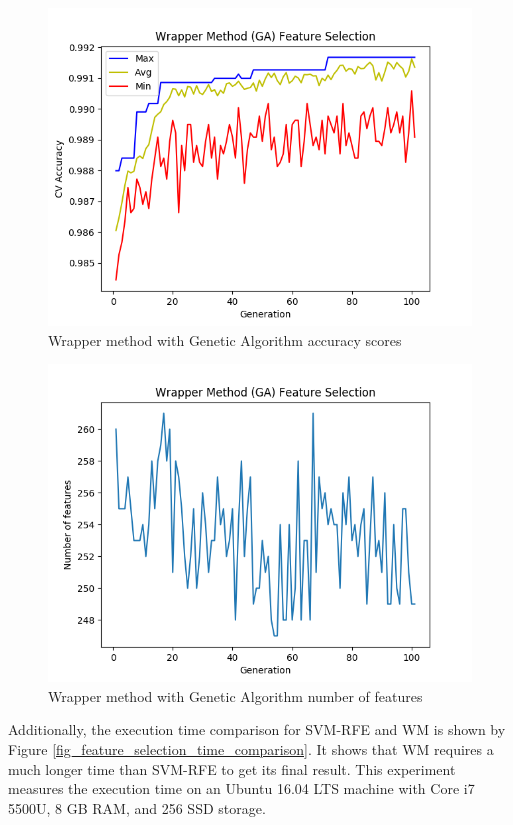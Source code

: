 \documentclass[conference]{IEEEtran}
\begin{document}
\begin{figure}
	\centering	
	\includegraphics[scale=0.45]{../images/WM_GA_SVM_acc_chart.png}
	\caption{Wrapper method with Genetic Algorithm accuracy scores}
	\label{fig_wm_acc_chart}
\end{figure}

\begin{figure}
	\centering	
	\includegraphics[scale=0.45]{../images/WM_GA_SVM_feat_chart.png}
	\caption{Wrapper method with Genetic Algorithm number of features}
	\label{fig_wm_num_features_chart}
\end{figure}

Additionally, the execution time comparison for SVM-RFE and WM is shown by Figure \ref{fig_feature_selection_time_comparison}. It shows that WM requires a much longer time than SVM-RFE to get its final result. This experiment measures the execution time on an Ubuntu 16.04 LTS machine with Core i7 5500U, 8 GB RAM, and 256 SSD storage.
\end{document}
